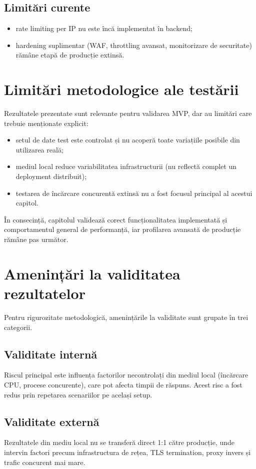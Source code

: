 \subsection{Limitări curente}
\begin{itemize}
    \item rate limiting per IP nu este încă implementat în backend;
    \item hardening suplimentar (WAF, throttling avansat, monitorizare de securitate) rămâne etapă de producție extinsă.
\end{itemize}

\section{Limitări metodologice ale testării}
Rezultatele prezentate sunt relevante pentru validarea MVP, dar au limitări care trebuie menționate explicit:
\begin{itemize}
    \item setul de date test este controlat și nu acoperă toate variațiile posibile din utilizarea reală;
    \item mediul local reduce variabilitatea infrastructurii (nu reflectă complet un deployment distribuit);
    \item testarea de încărcare concurentă extinsă nu a fost focusul principal al acestui capitol.
\end{itemize}

În consecință, capitolul validează corect funcționalitatea implementată și comportamentul general de performanță, iar profilarea avansată de producție rămâne pas următor.

\section{Amenințări la validitatea rezultatelor}
Pentru rigurozitate metodologică, amenințările la validitate sunt grupate în trei categorii.

\subsection{Validitate internă}
Riscul principal este influența factorilor necontrolați din mediul local (încărcare CPU, procese concurente), care pot afecta timpii de răspuns. Acest risc a fost redus prin repetarea scenariilor pe același setup.

\subsection{Validitate externă}
Rezultatele din mediu local nu se transferă direct 1:1 către producție, unde intervin factori precum infrastructura de rețea, TLS termination, proxy invers și trafic concurent mai mare.


